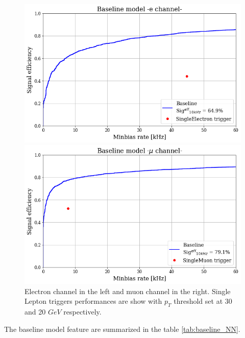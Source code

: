 \documentclass[../../main.tex]{subfiles}
\begin{document}
\begin{figure}[ht] 
  \label{ fig7} 
  \begin{minipage}[b]{0.5\linewidth}
    \centering
    \includegraphics[width=.95\linewidth]{sections/05/Images/baseline_1ele_ROC.png} 
    \vspace{4ex}
  \end{minipage}%
  \begin{minipage}[b]{0.5\linewidth}
    \centering
    \includegraphics[width=.95\linewidth]{sections/05/Images/baseline_1mu_ROC.png} 
    \vspace{4ex}
  \end{minipage} 
  \caption{Electron channel in the left and muon channel in the right. Single Lepton triggers performances are show with $p_T$ threshold set at 30 and 20 $GeV$ respectively.}
  \label{fig:baseline_models}
\end{figure}

The baseline model feature are summarized in the table \ref{tab:baseline_NN}.
\end{document}
